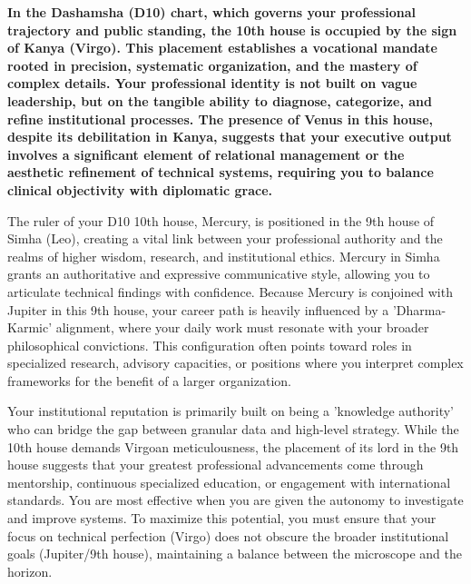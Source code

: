 
\label{topic27}

{\fontsize{9.5}{13.8}\selectfont\bfseries\color{DeepSlate} In the Dashamsha (D10) chart, which governs your professional trajectory and public standing, the 10th house is occupied by the sign of Kanya (Virgo). This placement establishes a vocational mandate rooted in precision, systematic organization, and the mastery of complex details. Your professional identity is not built on vague leadership, but on the tangible ability to diagnose, categorize, and refine institutional processes. The presence of Venus in this house, despite its debilitation in Kanya, suggests that your executive output involves a significant element of relational management or the aesthetic refinement of technical systems, requiring you to balance clinical objectivity with diplomatic grace.}\par\vspace{2mm}

{\fontsize{9}{13}\selectfont The ruler of your D10 10th house, Mercury, is positioned in the 9th house of Simha (Leo), creating a vital link between your professional authority and the realms of higher wisdom, research, and institutional ethics. Mercury in Simha grants an authoritative and expressive communicative style, allowing you to articulate technical findings with confidence. Because Mercury is conjoined with Jupiter in this 9th house, your career path is heavily influenced by a 'Dharma-Karmic' alignment, where your daily work must resonate with your broader philosophical convictions. This configuration often points toward roles in specialized research, advisory capacities, or positions where you interpret complex frameworks for the benefit of a larger organization.}\par\vspace{1.8mm}

{\fontsize{9}{13}\selectfont Your institutional reputation is primarily built on being a 'knowledge authority' who can bridge the gap between granular data and high-level strategy. While the 10th house demands Virgoan meticulousness, the placement of its lord in the 9th house suggests that your greatest professional advancements come through mentorship, continuous specialized education, or engagement with international standards. You are most effective when you are given the autonomy to investigate and improve systems. To maximize this potential, you must ensure that your focus on technical perfection (Virgo) does not obscure the broader institutional goals (Jupiter/9th house), maintaining a balance between the microscope and the horizon.}\par\vspace{1.8mm}

